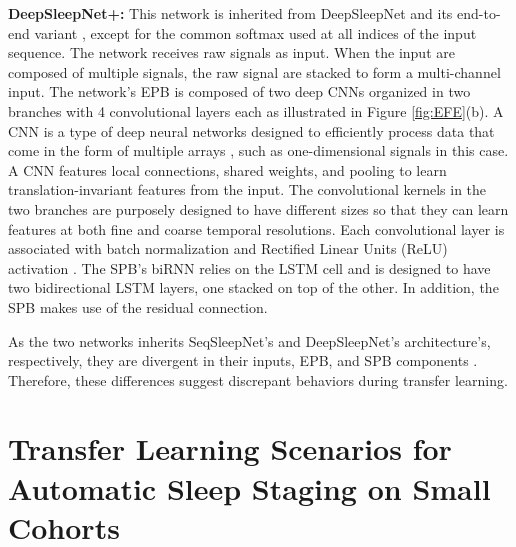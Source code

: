\documentclass[journal,twoside,web]{ieeecolor}
\begin{document}
{\bf DeepSleepNet+:} This network is inherited from DeepSleepNet \cite{Supratak2017} and its end-to-end variant \cite{Phan2019a}, except for the common softmax used at all indices of the input sequence. The network receives raw signals as input. When the input are composed of multiple signals, the raw signal are stacked to form a multi-channel input. The network's EPB is composed of two deep CNNs organized in two branches with 4 convolutional layers each as illustrated in Figure \ref{fig:EFE}(b). A CNN is a type of deep neural networks designed to efficiently process data that come in the form of multiple arrays \cite{LeCun2015}, such as one-dimensional signals in this case. A CNN features local connections, shared weights, and pooling to learn translation-invariant features from the input.  The convolutional kernels in the two branches are purposely designed to have different sizes so that they can learn features at both fine and coarse temporal resolutions. Each convolutional layer is associated with batch normalization \cite{Ioffe2015} and Rectified Linear Units (ReLU) activation \cite{Nair2010}. The SPB's biRNN relies on the LSTM cell  \cite{Hochreiter1997} and is designed to have two bidirectional LSTM layers, one stacked on top of the other. In addition, the SPB makes use of the residual connection.

As the two networks inherits SeqSleepNet's and DeepSleepNet's architecture's, respectively, they are divergent in their inputs, EPB, and SPB components \cite{Phan2019d}. Therefore, these differences suggest discrepant behaviors during transfer learning.

\vspace{-0.15cm}
\section{Transfer Learning Scenarios for Automatic Sleep Staging on Small Cohorts}
\end{document}
